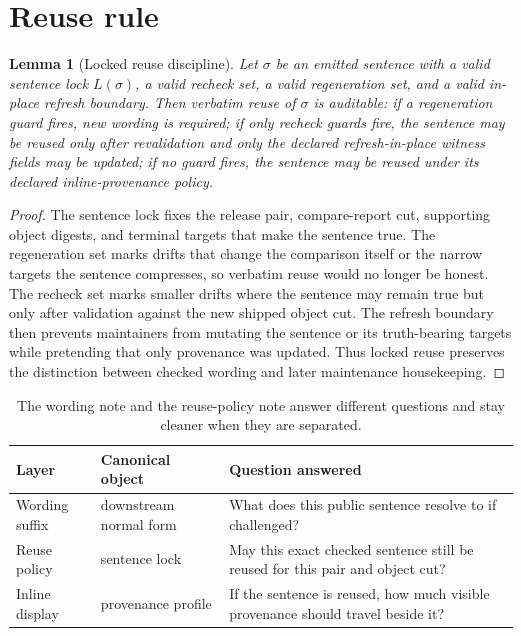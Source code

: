 \documentclass[11pt]{article}
\newtheorem{lemma}{Lemma}
\begin{document}
\section{Reuse rule}

\begin{lemma}[Locked reuse discipline]
Let $\sigma$ be an emitted sentence with a valid sentence lock $L(\sigma)$, a valid recheck set, a valid regeneration set, and a valid in-place refresh boundary.
Then verbatim reuse of $\sigma$ is auditable: if a regeneration guard fires, new wording is required; if only recheck guards fire, the sentence may be reused only after revalidation and only the declared refresh-in-place witness fields may be updated; if no guard fires, the sentence may be reused under its declared inline-provenance policy.
\end{lemma}

\begin{proof}
The sentence lock fixes the release pair, compare-report cut, supporting object digests, and terminal targets that make the sentence true.
The regeneration set marks drifts that change the comparison itself or the narrow targets the sentence compresses, so verbatim reuse would no longer be honest.
The recheck set marks smaller drifts where the sentence may remain true but only after validation against the new shipped object cut.
The refresh boundary then prevents maintainers from mutating the sentence or its truth-bearing targets while pretending that only provenance was updated.
Thus locked reuse preserves the distinction between checked wording and later maintenance housekeeping.
\end{proof}

\begin{table}[t]
\centering
\small
\begin{tabularx}{\linewidth}{@{}l l X@{}}
\toprule
Layer & Canonical object & Question answered \\
\midrule
Wording suffix & downstream normal form & What does this public sentence resolve to if challenged? \\
Reuse policy & sentence lock & May this exact checked sentence still be reused for this pair and object cut? \\
Inline display & provenance profile & If the sentence is reused, how much visible provenance should travel beside it? \\
\bottomrule
\end{tabularx}
\caption{The wording note and the reuse-policy note answer different questions and stay cleaner when they are separated.}
\label{tab:locksplit}
\end{table}
\end{document}
